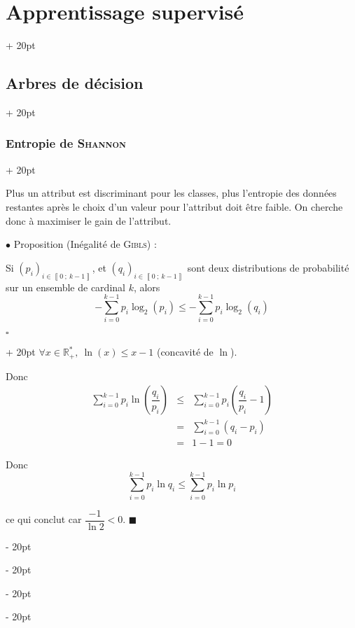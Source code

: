 \documentclass[a4paper, 12pt, twoside]{article}
\newcommand{\R}{\mathbb{R}} %
\newcommand{\nset}[2]{\left\llbracket #1\ ;\ #2 \right\rrbracket}
\newcommand{\lr}[1]{\left( #1 \right)}
\renewcommand{\le}{\leqslant}
\newcommand{\ind}[1][20pt]{\advance\leftskip + #1}
\newcommand{\deind}[1][20pt]{\advance\leftskip - #1}
\newenvironment{indt}[2][20pt]{#2 \par \ind[#1]}{\par \deind} %
\newenvironment{proof}[1][{}]{\begin{indt}{$\square$ #1}}{$\blacksquare$ \end{indt}}
\begin{document}
\begin{indt}{\section{Apprentissage supervisé}}
\begin{indt}{\subsection{Arbres de décision}}
\begin{indt}{\subsubsection{Entropie de \textsc{Shannon}}}
                \vspace{6pt}
                
                Plus un attribut est discriminant pour les classes, plus l'entropie des données restantes après le choix d'un valeur pour l'attribut doit être faible. On cherche donc à maximiser le gain de l'attribut.

                \vspace{12pt}
                
                $\bullet$ Proposition (Inégalité de \textsc{Gibls}) :
                \begin{emphBox}
                    Si $\lr{p_i}_{i \in \nset 0 {k - 1}}$, et $\lr{q_i}_{i \in \nset 0 {k - 1}}$ sont deux distributions de probabilité sur un ensemble de cardinal $k$, alors
                    \[
                        -\sum_{i = 0}^{k - 1} p_i \log_2(p_i)
                        \le
                        -\sum_{i = 0}^{k - 1} p_i \log_2(q_i)
                    \]
                \end{emphBox}

                \vspace{6pt}
                
                \begin{proof}
                    $\forall x \in \R^*_+,\ \ln(x) \le x - 1$ (concavité de $\ln$).

                    Donc
                    \[
                        \begin{array}{rcl}
                            \displaystyle
                            \sum_{i = 0}^{k - 1} p_i \ln\!\lr{\dfrac{q_i}{p_i}}
                            &\le& \displaystyle
                            \sum_{i = 0}^{k - 1} p_i \lr{\dfrac{q_i}{p_i} - 1}
                            \\
                            &=& \displaystyle
                            \sum_{i = 0}^{k - 1} (q_i - p_i)
                            \\
                            &=& 1 - 1 = 0
                        \end{array}
                    \]

                    Donc
                    \[
                        \sum_{i = 0}^{k - 1} p_i \ln q_i
                        \le
                        \sum_{i = 0}^{k - 1} p_i \ln p_i
                    \]

                    ce qui conclut car $\dfrac{-1}{\ln 2} < 0$.
                \end{proof}


\end{indt}
\end{indt}
\end{indt}
\end{document}
